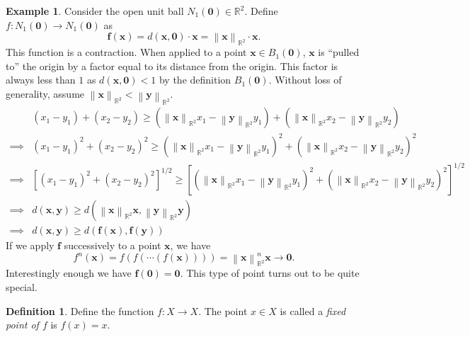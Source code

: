 \documentclass{article}
\newcommand{\R}{\mathbb{R}}
\newcommand{\x}{\mathbf{x}}
\newcommand{\f}{\mathbf{f}}
\newcommand{\y}{\mathbf{y}}
\newcommand{\ze}{\mathbf{0}}
\newcommand{\norm}[1]{\left\lVert#1\right\rVert}
\theoremstyle{definition}
\newtheorem{definition}{Definition}[section]
\newtheorem{example}{Example}[section]
\begin{document}
	\begin{example}
		Consider the open unit ball $N_1(\ze)\in \R^2 $. Define $ f: N_1(\ze)\to N_1(\ze) $ as $$\f(\x) = 
		d(\x,\ze)\cdot\x = \norm{\x}_{\R^2}\cdot \x .$$
		This function is a contraction. When applied to a point $ \x\in B_1(\ze)  $, $ \x $ is ``pulled to'' the origin by a factor equal to its distance from the origin. This factor is always less than $ 1 $ as $ d(\x,\ze) < 1$ by the definition $ B_1(\ze) $. Without loss of generality, assume $ \norm{\x}_{\R^2}  < \norm{\y}_{\R^2} $.
		\begin{align*}
			&(x_1-y_1) + (x_2-y_2)  \ge (\norm{\x}_{\R^2} x_1-\norm{\y}_{\R^2}y_1) + (\norm{\x}_{\R^2}x_2-\norm{\y}_{\R^2}y_2)\\ 
			\implies &	(x_1-y_1)^2 + (x_2-y_2)^2  \ge (\norm{\x}_{\R^2} x_1-\norm{\y}_{\R^2}y_1)^2 + (\norm{\x}_{\R^2}x_2-\norm{\y}_{\R^2}y_2)^2 \\
			\implies & \left[(x_1-y_1)^2 + (x_2-y_2)^2 \right]^{1/2} \ge \left[(\norm{\x}_{\R^2} x_1-\norm{\y}_{\R^2}y_1)^2 + (\norm{\x}_{\R^2}x_2-\norm{\y}_{\R^2}y_2)^2 \right]^{1/2}\\
			\implies & d(\x,\y) \ge d\left(\norm{\x}_{\R^2}\x, \norm{\y}_{\R^2}\y\right)\\
			\implies & d(\x,\y) \ge d\left(\f(\x), \f(\y)\right)
		\end{align*}
		If we apply $ \f $ successively to a point $ \x $, we have $$ f^n(\x) = f(f(\cdots(f(\x)))) = \norm{\x}_{\R^2}^n\x \to \ze.$$ 
		Interestingly enough we have $ \f(\ze) = \ze $. This type of point turns out to be quite special.
	\end{example}
	\begin{definition}
		Define the function $ f:X\to X $. The point $ x\in X $ is called a \textit{\color{red}fixed point of $ f $} is $ f(x)=x $. 
	\end{definition}
	
\end{document}
